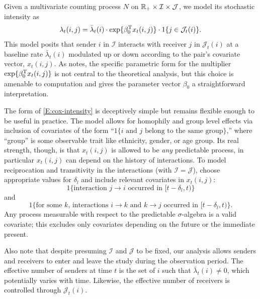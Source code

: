 \documentclass[final]{statsoc}
\begin{document}
Given a multivariate counting process $N$ on
$\mathbb{R}_+ \times \mathcal{I} \times \mathcal{J}$,
we model its stochastic intensity as
\begin{equation}\label{E:cox-intensity}
    \lambda_t(i,j)
        =
        \bar \lambda_t(i)
        \cdot
        \exp\{ \beta_0^{\mathrm{T}} x_t(i, j) \}
        \cdot
        1{\{j \in \mathcal{J}_t(i)\}}.
\end{equation}
This model posits that sender $i$ in $\mathcal{I}$ interacts  with receiver $j$
in $\mathcal{J}_t(i)$ at a baseline rate $\bar \lambda_t(i)$ modulated up or
down according to the pair's covariate vector, $x_t(i,j)$.  As
\citet{efron1977efficiency} notes, the specific parametric form for the multiplier
$\exp\{ \beta_0^{\mathrm{T}} x_t(i,j) \}$ is not central to the theoretical
analysis, but this choice is amenable to computation and gives
the parameter vector $\beta_0$ a straightforward interpretation.

The form of \eqref{E:cox-intensity} is deceptively simple but remains
flexible enough to be useful in practice.  The model allows for
homophily and group level effects via inclusion of covariates of the form
``$1\{\text{$i$ and $j$ belong to the same group}\}$,'' where ``group'' is
some observable trait like ethnicity, gender, or age group.  Its real
strength, though, is that $x_t(i,j)$ is allowed to be \emph{any}
predictable process, in particular $x_t(i,j)$ can depend on the history
of interactions.  To model reciprocation and transitivity in the
interactions  (with $\mathcal{I} = \mathcal{J}$), choose appropriate
values for $\delta_l$ and include relevant covariates in $x_t(i,j)$:
\[
    1\{\text{interaction $j \to i$ occurred in $[t - \delta_l,t)$}\}
\]
and
\[
    1\{\text{for some $k$, interactions $i\to k$ and $k \to j$ occurred in
             $[t - \delta_l, t)$}\}.
\]
Any process measurable with respect to the predictable $\sigma$-algebra is
a valid covariate; this excludes only covariates depending on the future
or the immediate present.

Also note that despite presuming $\mathcal{I}$ and $\mathcal{J}$ to be fixed, 
our analysis
allows senders and receivers to enter and leave the study during the
observation period.  The effective number of senders at time $t$ is the
set of $i$ such that $\bar \lambda_t(i) \neq 0$, which potentially varies
with time.  Likewise, the effective number of receivers is controlled through
$\mathcal{J}_t(i)$.
\end{document}
